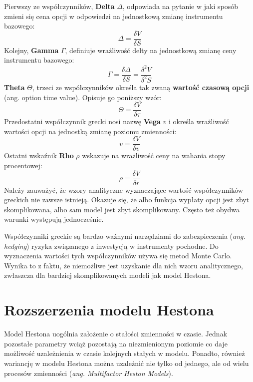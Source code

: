 \documentclass{pracamgr}
\begin{document}
Pierwszy ze współczynników, \textbf{Delta} $\Delta$, odpowiada na pytanie w jaki 
sposób zmieni się cena opcji w odpowiedzi na
jednostkową zmianę instrumentu bazowego:
\begin{equation}
  \Delta = \frac{\delta V}{\delta S}
\end{equation} 
Kolejny, \textbf{Gamma} $\Gamma$, definiuje wrażliwość delty na 
jednostkową zmianę ceny instrumentu bazowego:
\begin{equation}
  \Gamma = \frac{\delta \Delta}{\delta S} = \frac{\delta^2 V}{\delta^2 S}
\end{equation}
\textbf{Theta} $\Theta$, trzeci ze współczynników określa tak 
zwaną \textbf{wartość czasową opcji} (ang. option time value).
Opisuje go poniższy wzór:
\begin{equation}
  \Theta = \frac{\delta V}{\delta \tau}
\end{equation}
Przedostatni współczynnik grecki nosi nazwę \textbf{Vega} $v$ i określa wrażliwość wartości 
opcji na jednostką zmianę poziomu
zmienności:
\begin{equation}
  v = \frac{\delta V}{\delta v}
\end{equation}
Ostatni wskaźnik \textbf{Rho} $\rho$ wskazuje na wrażliwość ceny na wahania stopy procentowej:
\begin{equation}
  \rho = \frac{\delta V}{\delta r}
\end{equation}
Należy zauważyć, że wzory analityczne wyznaczające wartość współczynników greckich nie zawsze istnieją. 
Okazuje się, że albo funkcja wypłaty opcji jest zbyt skomplikowana, albo sam model jest zbyt 
skomplikowany. Często też obydwa warunki występują jednocześnie. 

Współczynniki greckie są bardzo ważnymi narzędziami 
do zabezpieczenia (\textit{ang. hedging}) ryzyka 
związanego z inwestycją w instrumenty pochodne.
Do wyznaczenia wartości tych współczynników używa się metod Monte Carlo. Wynika to z faktu, 
że niemożliwe jest uzyskanie dla nich wzoru analitycznego, 
zwłaszcza dla bardziej skomplikowanych modeli jak model Hestona.

\section{Rozszerzenia modelu Hestona}

Model Hestona uogólnia założenie o stałości zmienności w czasie. 
Jednak pozostałe parametry wciąż pozostają na niezmienionym poziomie
co daje możliwość uzależnienia w czasie kolejnych stałych w modelu.
Ponadto, również wariancję w modelu Hestona można uzależnić nie tylko 
od jednego, ale od wielu procesów zmienności (\textit{ang. Multifactor Heston Models}).
\end{document}

